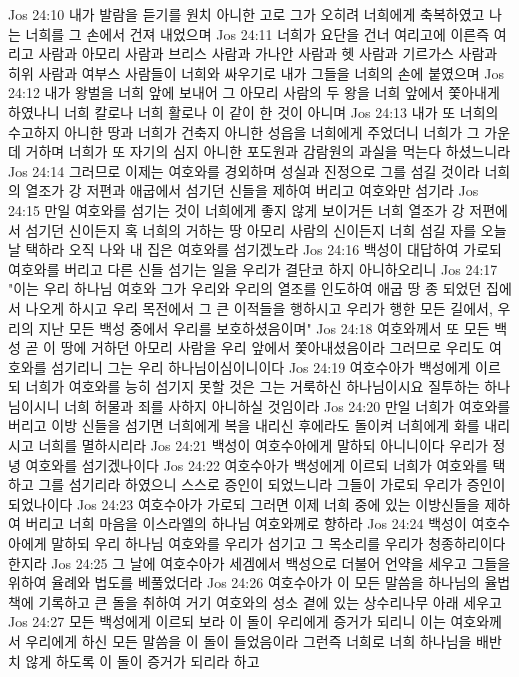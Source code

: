 Jos 24:10  내가 발람을 듣기를 원치 아니한 고로 그가 오히려 너희에게 축복하였고 나는 너희를 그 손에서 건져 내었으며
Jos 24:11  너희가 요단을 건너 여리고에 이른즉 여리고 사람과 아모리 사람과 브리스 사람과 가나안 사람과 헷 사람과 기르가스 사람과 히위 사람과 여부스 사람들이 너희와 싸우기로 내가 그들을 너희의 손에 붙였으며
Jos 24:12  내가 왕벌을 너희 앞에 보내어 그 아모리 사람의 두 왕을 너희 앞에서 쫓아내게 하였나니 너희 칼로나 너희 활로나 이 같이 한 것이 아니며
Jos 24:13  내가 또 너희의 수고하지 아니한 땅과 너희가 건축지 아니한 성읍을 너희에게 주었더니 너희가 그 가운데 거하며 너희가 또 자기의 심지 아니한 포도원과 감람원의 과실을 먹는다 하셨느니라
Jos 24:14  그러므로 이제는 여호와를 경외하며 성실과 진정으로 그를 섬길 것이라 너희의 열조가 강 저편과 애굽에서 섬기던 신들을 제하여 버리고 여호와만 섬기라
Jos 24:15  만일 여호와를 섬기는 것이 너희에게 좋지 않게 보이거든 너희 열조가 강 저편에서 섬기던 신이든지 혹 너희의 거하는 땅 아모리 사람의 신이든지 너희 섬길 자를 오늘날 택하라 오직 나와 내 집은 여호와를 섬기겠노라
Jos 24:16  백성이 대답하여 가로되 여호와를 버리고 다른 신들 섬기는 일을 우리가 결단코 하지 아니하오리니
Jos 24:17  "이는 우리 하나님 여호와 그가 우리와 우리의 열조를 인도하여 애굽 땅 종 되었던 집에서 나오게 하시고 우리 목전에서 그 큰 이적들을 행하시고 우리가 행한 모든 길에서, 우리의 지난 모든 백성 중에서 우리를 보호하셨음이며"
Jos 24:18  여호와께서 또 모든 백성 곧 이 땅에 거하던 아모리 사람을 우리 앞에서 쫓아내셨음이라 그러므로 우리도 여호와를 섬기리니 그는 우리 하나님이심이니이다
Jos 24:19  여호수아가 백성에게 이르되 너희가 여호와를 능히 섬기지 못할 것은 그는 거룩하신 하나님이시요 질투하는 하나님이시니 너희 허물과 죄를 사하지 아니하실 것임이라
Jos 24:20  만일 너희가 여호와를 버리고 이방 신들을 섬기면 너희에게 복을 내리신 후에라도 돌이켜 너희에게 화를 내리시고 너희를 멸하시리라
Jos 24:21  백성이 여호수아에게 말하되 아니니이다 우리가 정녕 여호와를 섬기겠나이다
Jos 24:22  여호수아가 백성에게 이르되 너희가 여호와를 택하고 그를 섬기리라 하였으니 스스로 증인이 되었느니라 그들이 가로되 우리가 증인이 되었나이다
Jos 24:23  여호수아가 가로되 그러면 이제 너희 중에 있는 이방신들을 제하여 버리고 너희 마음을 이스라엘의 하나님 여호와께로 향하라
Jos 24:24  백성이 여호수아에게 말하되 우리 하나님 여호와를 우리가 섬기고 그 목소리를 우리가 청종하리이다 한지라
Jos 24:25  그 날에 여호수아가 세겜에서 백성으로 더불어 언약을 세우고 그들을 위하여 율례와 법도를 베풀었더라
Jos 24:26  여호수아가 이 모든 말씀을 하나님의 율법책에 기록하고 큰 돌을 취하여 거기 여호와의 성소 곁에 있는 상수리나무 아래 세우고
Jos 24:27  모든 백성에게 이르되 보라 이 돌이 우리에게 증거가 되리니 이는 여호와께서 우리에게 하신 모든 말씀을 이 돌이 들었음이라 그런즉 너희로 너희 하나님을 배반치 않게 하도록 이 돌이 증거가 되리라 하고
